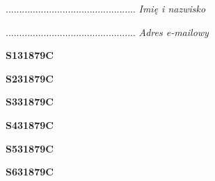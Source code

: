 \begin{turn}{90}\begin{minipage}{\linewidth} \vspace{20mm} ................................................  \textit{Imię i nazwisko}\end{minipage}\end{turn}

\begin{turn}{90}\begin{minipage}{\linewidth} \vspace{20mm} ................................................  \textit{Adres e-mailowy}\end{minipage}\end{turn}

\begin{turn}{90}\huge \begin{minipage}{\linewidth} \vspace{10mm}\textbf{S131879C}\end{minipage}\end{turn}

\begin{turn}{90}\huge \begin{minipage}{\linewidth} \vspace{10mm}\textbf{S231879C}\end{minipage}\end{turn}

\begin{turn}{90}\huge \begin{minipage}{\linewidth} \vspace{10mm}\textbf{S331879C}\end{minipage}\end{turn}

\begin{turn}{90}\huge \begin{minipage}{\linewidth} \vspace{10mm}\textbf{S431879C}\end{minipage}\end{turn}

\begin{turn}{90}\huge \begin{minipage}{\linewidth} \vspace{10mm}\textbf{S531879C}\end{minipage}\end{turn}

\begin{turn}{90}\huge \begin{minipage}{\linewidth} \vspace{10mm}\textbf{S631879C}\end{minipage}\end{turn}

